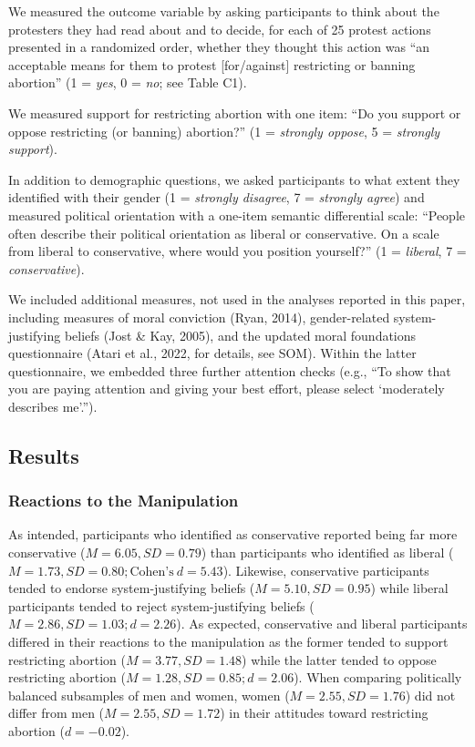 \documentclass[twocolumn, 11pt, letterpaper]{article}
\begin{document}
We measured the outcome variable by asking participants to think about
the protesters they had read about and to decide, for each of 25 protest
actions presented in a randomized order, whether they thought this
action was ``an acceptable means for them to protest {[}for/against{]}
restricting or banning abortion'' (1 = \emph{yes}, 0 = \emph{no}; see
Table C1).

We measured support for restricting abortion with one item: ``Do you
support or oppose restricting (or banning) abortion?'' (1 =
\emph{strongly oppose}, 5 = \emph{strongly support}).

In addition to demographic questions, we asked participants to what
extent they identified with their gender (1 = \emph{strongly disagree},
7 = \emph{strongly agree}) and measured political orientation with a
one-item semantic differential scale: ``People often describe their
political orientation as liberal or conservative. On a scale from
liberal to conservative, where would you position yourself?'' (1 =
\emph{liberal}, 7 = \emph{conservative}).

We included additional measures, not used in the analyses reported in
this paper, including measures of moral conviction (Ryan, 2014),
gender-related system-justifying beliefs (Jost \& Kay, 2005), and the
updated moral foundations questionnaire (Atari et al., 2022, for
details, see SOM). Within the latter questionnaire, we embedded three
further attention checks (e.g., ``To show that you are paying attention
and giving your best effort, please select `moderately describes
me'.'').

\hypertarget{results-2}{%
\subsection{Results}\label{results-2}}

\hypertarget{reactions-to-the-manipulation-2}{%
\subsubsection{Reactions to the
Manipulation}\label{reactions-to-the-manipulation-2}}

As intended, participants who identified as conservative reported being
far more conservative (\(M = 6.05, SD = 0.79\)) than participants who
identified as liberal
(\(M = 1.73, SD = 0.80; \text{Cohen's}~d = 5.43\)). Likewise,
conservative participants tended to endorse system-justifying beliefs
(\(M = 5.10, SD = 0.95\)) while liberal participants tended to reject
system-justifying beliefs (\(M = 2.86, SD = 1.03; d = 2.26\)). As
expected, conservative and liberal participants differed in their
reactions to the manipulation as the former tended to support
restricting abortion (\(M = 3.77, SD = 1.48\)) while the latter tended
to oppose restricting abortion (\(M = 1.28, SD = 0.85; d = 2.06\)). When
comparing politically balanced subsamples of men and women, women
(\(M = 2.55, SD = 1.76\)) did not differ from men
(\(M = 2.55, SD = 1.72\)) in their attitudes toward restricting abortion
(\(d = -0.02\)).
\end{document}

